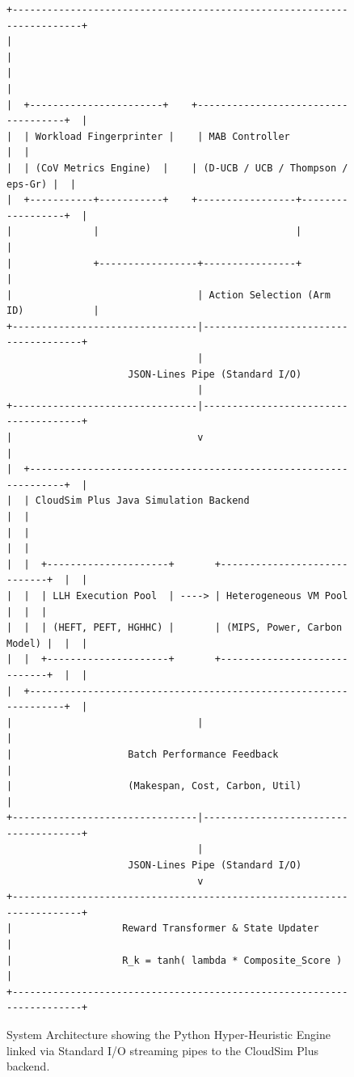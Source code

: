 \begin{figure}[htbp]
\centering
\begin{verbatim}
+-----------------------------------------------------------------------+
|                                                                       |
|                                                                       |
|  +-----------------------+    +------------------------------------+  |
|  | Workload Fingerprinter |    | MAB Controller                    |  |
|  | (CoV Metrics Engine)  |    | (D-UCB / UCB / Thompson / eps-Gr) |  |
|  +-----------+-----------+    +-----------------+------------------+  |
|              |                                  |                     |
|              +-----------------+----------------+                     |
|                                | Action Selection (Arm ID)            |
+--------------------------------|--------------------------------------+
                                 |
                     JSON-Lines Pipe (Standard I/O)
                                 |
+--------------------------------|--------------------------------------+
|                                v                                      |
|  +-----------------------------------------------------------------+  |
|  | CloudSim Plus Java Simulation Backend                           |  |
|  |                                                                 |  |
|  |  +---------------------+       +-----------------------------+  |  |
|  |  | LLH Execution Pool  | ----> | Heterogeneous VM Pool       |  |  |
|  |  | (HEFT, PEFT, HGHHC) |       | (MIPS, Power, Carbon Model) |  |  |
|  |  +---------------------+       +-----------------------------+  |  |
|  +-----------------------------------------------------------------+  |
|                                |                                      |
|                    Batch Performance Feedback                         |
|                    (Makespan, Cost, Carbon, Util)                     |
+--------------------------------|--------------------------------------+
                                 |
                     JSON-Lines Pipe (Standard I/O)
                                 v
+-----------------------------------------------------------------------+
|                   Reward Transformer & State Updater                  |
|                   R_k = tanh( lambda * Composite_Score )              |
+-----------------------------------------------------------------------+
\end{verbatim}
\caption{System Architecture showing the Python Hyper-Heuristic Engine linked via Standard I/O streaming pipes to the CloudSim Plus backend.}
\label{fig:arch_pipeline}
\end{figure}


